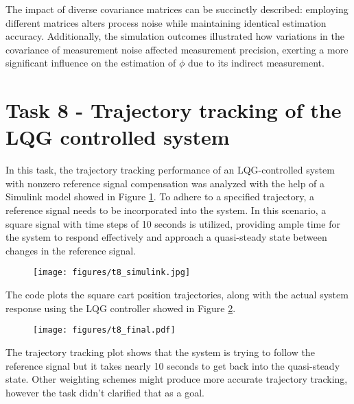 \documentclass[12pt]{article}
\begin{document}
\medskip
\noindent The impact of diverse covariance matrices can be succinctly described: employing different matrices alters process noise while maintaining identical estimation accuracy. Additionally, the simulation outcomes illustrated how variations in the covariance of measurement noise affected measurement precision, exerting a more significant influence on the estimation of $\phi$ due to its indirect measurement.

\section*{Task 8 - Trajectory tracking of the LQG controlled system}
In this task, the trajectory tracking performance of an LQG-controlled system with nonzero reference signal compensation was analyzed with the help of a Simulink model showed in Figure \ref{fig:task8_simulink}. To adhere to a specified trajectory, a reference signal needs to be incorporated into the system. In this scenario, a square signal with time steps of 10 seconds is utilized, providing ample time for the system to respond effectively and approach a quasi-steady state between changes in the reference signal.


\begin{figure}[ht!]
  \begin{center}
  \texttt{[image: figures/t8\_simulink.jpg]}
  \label{fig:task8_simulink}
  \end{center}
\end{figure}

\newpage
\noindent The code plots the square cart position trajectories, along with the actual system response using the LQG controller showed in Figure \ref{fig:task8}.

\begin{figure}[ht!]
  \begin{center}
  \texttt{[image: figures/t8\_final.pdf]}
  \label{fig:task8}
  \end{center}
\end{figure}

\noindent The trajectory tracking plot shows that the system is trying to follow the reference signal but it takes nearly 10 seconds to get back into the quasi-steady state. Other weighting schemes might produce more accurate trajectory tracking, however the task didn't clarified that as a goal.
\end{document}
